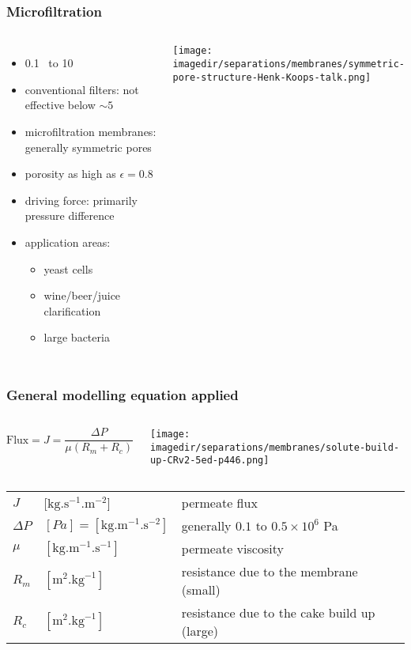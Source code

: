 \begin{frame}\frametitle{Microfiltration}
	\begin{columns}[t]
			\begin{itemize}
				\item	0.1 \micron ~to 10 \micron
				\item	conventional filters: not effective below $\sim 5$~\micron
				\item	microfiltration membranes: generally symmetric pores
				\item	porosity as high as $\epsilon = 0.8$
				\item	driving force: primarily pressure difference
				\item	application areas:
					\begin{itemize}
						\item	yeast cells
						\item	wine/beer/juice clarification
						\item	large bacteria
					\end{itemize}
			\end{itemize}
			\begin{center}
				\texttt{[image: \\imagedir/separations/membranes/symmetric-pore-structure-Henk-Koops-talk.png]}
			\end{center}
	\end{columns}	
\end{frame}

\begin{frame}\frametitle{General modelling equation applied}
	\begin{exampleblock}{}
		\begin{columns}[c]
				\[
					\text{Flux} = J = \displaystyle \frac{\Delta P}{\mu \left(R_m + R_c \right)}
				\]
				\begin{center}
					\texttt{[image: \\imagedir/separations/membranes/solute-build-up-CRv2-5ed-p446.png]}
				\end{center}
		\end{columns}		
	\end{exampleblock}	
	\vspace{6pt}
	\begin{tabular}{lll}
		$J$			&	[$\text{kg}.\text{s}^{-1}\text{.m}^{-2}$] 			& permeate flux \\
		$\Delta P$	&	$[Pa] = [\text{kg}.\text{m}^{-1}\text{.s}^{-2}]$ 	& generally $0.1 \text{~to~} 0.5 \times 10^6$ Pa \\
		$\mu$ 		&  	$[\text{kg}.\text{m}^{-1}\text{.s}^{-1}]$			& permeate viscosity\\
		$R_m$ 		&  	$[\text{m}^2.\text{kg}^{-1}]$						& resistance due to the membrane (small)\\
		$R_c$ 		&  	$[\text{m}^2.\text{kg}^{-1}]$						& resistance due to the cake build up (large)\\
	\end{tabular}
\end{frame}

